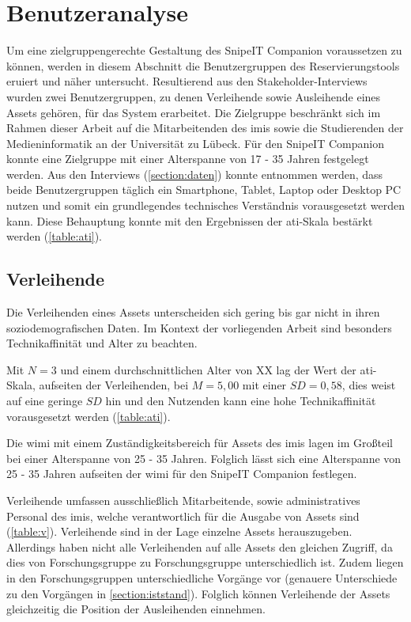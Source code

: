 \section{Benutzeranalyse}
\label{section:benutzer}
Um eine zielgruppengerechte Gestaltung des SnipeIT Companion voraussetzen zu können, werden in
diesem Abschnitt die Benutzergruppen des Reservierungstools eruiert und näher untersucht.
Resultierend aus den Stakeholder-Interviews wurden zwei Benutzergruppen, zu denen Verleihende sowie
Ausleihende eines Assets gehören, für das System erarbeitet. Die Zielgruppe beschränkt sich im
Rahmen dieser Arbeit auf die Mitarbeitenden des \ac{imis} sowie die Studierenden der
Medieninformatik an der Universität zu Lübeck. Für den SnipeIT Companion konnte eine Zielgruppe mit
einer Alterspanne von 17 - 35 Jahren festgelegt werden. Aus den Interviews (\ref{section:daten})
konnte entnommen werden, dass beide Benutzergruppen täglich ein Smartphone, Tablet, Laptop oder
Desktop PC nutzen und somit ein grundlegendes technisches Verständnis vorausgesetzt werden kann.
Diese Behauptung konnte mit den Ergebnissen der \ac{ati}-Skala bestärkt werden (\ref{table:ati}).


\subsection{Verleihende}
Die Verleihenden eines Assets unterscheiden sich gering bis gar nicht in ihren soziodemografischen
Daten. Im Kontext der vorliegenden Arbeit sind besonders Technikaffinität und Alter zu beachten.

Mit $N=3$ und einem durchschnittlichen Alter von XX lag der Wert der \ac{ati}-Skala, aufseiten der
Verleihenden, bei $M=5,00$ mit einer $SD=0,58$, dies weist auf eine geringe $SD$ hin und den
Nutzenden kann eine hohe Technikaffinität vorausgesetzt werden  (\ref{table:ati}).

Die \ac{wimi} mit einem Zuständigkeitsbereich für Assets des \ac{imis} lagen im Großteil bei einer
Alterspanne von 25 - 35 Jahren. Folglich lässt sich eine Alterspanne von 25 - 35 Jahren aufseiten
der \ac{wimi} für den SnipeIT Companion festlegen.

Verleihende umfassen ausschließlich Mitarbeitende, sowie administratives Personal des \ac{imis},
welche verantwortlich für die Ausgabe von Assets sind (\ref{table:v}). Verleihende sind in der Lage
einzelne Assets herauszugeben. Allerdings haben nicht alle Verleihenden auf alle Assets den gleichen
Zugriff, da dies von Forschungsgruppe zu Forschungsgruppe unterschiedlich ist. Zudem liegen in den
Forschungsgruppen unterschiedliche Vorgänge vor (genauere Unterschiede zu den Vorgängen in
\ref{section:iststand}). Folglich können Verleihende der Assets gleichzeitig die Position der
Ausleihenden einnehmen.

